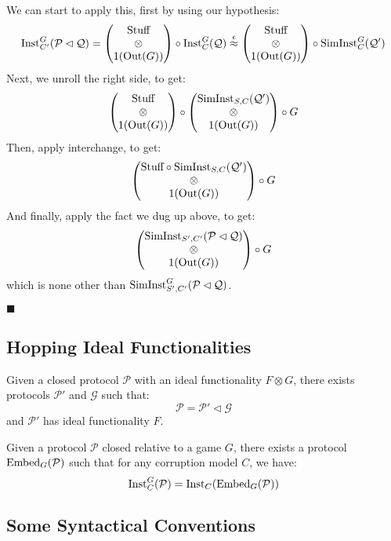 \begin{theorem}
  We can start to apply this, first by using our hypothesis:
  $$
  \text{Inst}^G_{C'}(\mathcal{P} \lhd \mathcal{Q}) =
  \begin{pmatrix}
    \text{Stuff}\cr
    \otimes\cr
    1(\text{Out}(G))
  \end{pmatrix}
  \circ \text{Inst}^G_C(\mathcal{Q})
  \overset{\epsilon}{\approx}
  \begin{pmatrix}
    \text{Stuff}\cr
    \otimes\cr
    1(\text{Out}(G))
  \end{pmatrix}
  \circ \text{SimInst}^G_C(\mathcal{Q}')
  $$
  Next, we unroll the right side, to get:
  $$
  \begin{pmatrix}
    \text{Stuff}\cr
    \otimes\cr
    1(\text{Out}(G))
  \end{pmatrix}
  \circ
  \begin{pmatrix}
    \text{SimInst}_{S, C}(\mathcal{Q}')\cr
    \otimes\cr
    1(\text{Out}(G))
  \end{pmatrix}
  \circ
  G
  $$
  Then, apply interchange, to get:
  $$
  \begin{pmatrix}
    \text{Stuff} \circ \text{SimInst}_{S, C}(\mathcal{Q}')\cr
    \otimes\cr
    1(\text{Out}(G))
  \end{pmatrix}
  \circ
  G
  $$
  And finally, apply the fact we dug up above, to get:
  $$
  \begin{pmatrix}
    \text{SimInst}_{S', C'}(\mathcal{P} \lhd \mathcal{Q})\cr
    \otimes\cr
    1(\text{Out}(G))
  \end{pmatrix}
  \circ
  G
  $$
  which is none other than $\text{SimInst}^G_{S', C'}(\mathcal{P} \lhd \mathcal{Q})$.

  $\blacksquare$
\end{theorem}

\subsection{Hopping Ideal Functionalities}

\begin{lemma}
  Given a closed protocol $\mathcal{P}$ with an ideal functionality $F \otimes G$,
  there exists protocols $\mathcal{P}'$ and $\mathcal{G}$
  such that:
  $$
  \mathcal{P} = \mathcal{P}' \lhd \mathcal{G}
  $$
  and $\mathcal{P}'$ has ideal functionality $F$.


\end{lemma}

\begin{lemma}
  Given a protocol $\mathcal{P}$ closed relative to a game $G$,
  there exists a protocol $\text{Embed}_G(\mathcal{P})$ such that for any
  corruption model $C$, we have:
  $$
  \text{Inst}^G_C(\mathcal{P}) = \text{Inst}_C(\text{Embed}_G(\mathcal{P}))
  $$

\end{lemma}

\subsection{Some Syntactical Conventions}
